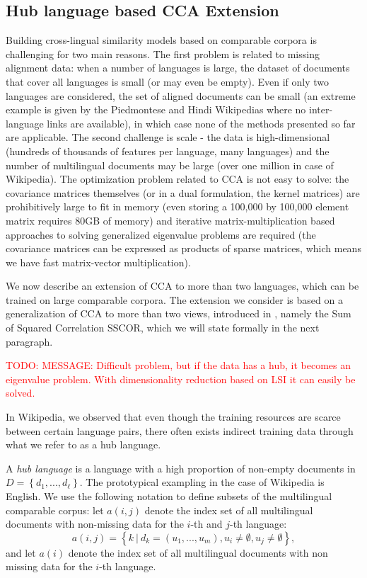 \documentclass[twoside,11pt]{article}
\newcommand{\todo}[1]{\textcolor{red}{TODO: #1}}
\begin{document}
\subsection{Hub language based CCA Extension}\label{sec:hublang}
Building cross-lingual similarity models based on comparable corpora is challenging for two main reasons. The first problem is related to missing alignment data: when a number of languages is large, the dataset of documents that cover all languages is small (or may even be empty). Even if only two languages are considered, the set of aligned documents can be small (an extreme example is given by the Piedmontese and Hindi Wikipedias where no inter-language links are available), in which case none of the methods presented so far are applicable. 
 The second challenge is scale - the data is high-dimensional (hundreds of thousands of features per language, many languages) and the number of multilingual documents may be large (over one million in case of Wikipedia). The optimization problem related to CCA is not
 easy to solve: the covariance matrices themselves (or in a dual formulation, the kernel matrices) are prohibitively large to fit in memory (even storing a 100,000 by 100,000 element matrix requires 80GB of memory) and iterative matrix-multiplication based approaches to 
 solving generalized eigenvalue problems are required (the covariance matrices can be expressed as products of sparse matrices, which means we have fast matrix-vector multiplication).

We now describe an extension of CCA to more than two languages, which can be trained on large comparable corpora.
 The extension we consider is based on a generalization of CCA to more than two views, introduced in \cite{Kettenring}, namely the Sum of Squared Correlation SSCOR, which we will state formally in the next paragraph. 
 
 \todo{MESSAGE: Difficult problem, but if the data has a hub, it becomes an eigenvalue problem. With dimensionality reduction based on LSI it can easily be solved.}
 




In Wikipedia, we observed that even though the training resources are scarce between certain language pairs, there often exists indirect training data through what we refer to as a hub language.

A \emph{hub language} is a language with a high proportion of non-empty documents in $D = \left\{d_1,..., d_{\ell}\right\}$. The prototypical  exampling  in the case of Wikipedia is English. We use the following notation to define subsets of the multilingual comparable corpus: let $a(i,j)$ denote the index set of all multilingual documents with non-missing data for the $i$-th and $j$-th language:  $$a(i,j) = \left\{k~ |~ d_k = (u_1,...,u_m), u_i \neq \emptyset, u_j \neq \emptyset \right\},$$ and let $a(i)$ denote the index set of all multilingual documents with non missing data for the $i$-th language.
\end{document}
